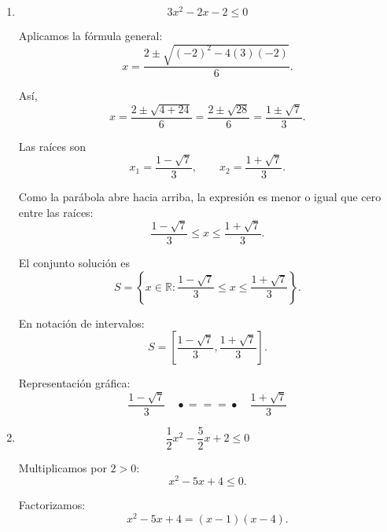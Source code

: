 \documentclass[12pt]{article}
\begin{document}
{\begin{enumerate}
Multiplicamos por \(-1\), invirtiendo el sentido de la desigualdad:
\[
x^2-3x-6\geq0.
\]

Aplicamos la fórmula general:
\[
x=
\frac{3\pm\sqrt{(-3)^2-4(1)(-6)}}{2}
=
\frac{3\pm\sqrt{9+24}}{2}.
\]

Por tanto,
\[
x=
\frac{3\pm\sqrt{33}}{2}.
\]

Las raíces son
\[
x_1=
\frac{3-\sqrt{33}}{2},
\qquad
x_2=
\frac{3+\sqrt{33}}{2}.
\]

Como
\[
x^2-3x-6\geq0,
\]

la solución corresponde a los intervalos exteriores:
\[
x\leq
\frac{3-\sqrt{33}}{2}
\qquad\text{o}\qquad
x\geq
\frac{3+\sqrt{33}}{2}.
\]

El conjunto solución es
\[
\boxed{
S=
\left\{
x\in\mathbb{R}:
x\leq
\frac{3-\sqrt{33}}{2}
\text{ o }
x\geq
\frac{3+\sqrt{33}}{2}
\right\}.
}
\]

En notación de intervalos:
\[
\boxed{
S=
\left(
-\infty,
\frac{3-\sqrt{33}}{2}
\right]
\cup
\left[
\frac{3+\sqrt{33}}{2},
\infty
\right).
}
\]

\item
\[
3x^2-2x-2\leq0
\]

Aplicamos la fórmula general:
\[
x=
\frac{2\pm\sqrt{(-2)^2-4(3)(-2)}}{6}.
\]

Así,
\[
x
=
\frac{2\pm\sqrt{4+24}}{6}
=
\frac{2\pm\sqrt{28}}{6}
=
\frac{1\pm\sqrt{7}}{3}.
\]

Las raíces son
\[
x_1=
\frac{1-\sqrt{7}}{3},
\qquad
x_2=
\frac{1+\sqrt{7}}{3}.
\]

Como la parábola abre hacia arriba, la expresión es menor o igual que
cero entre las raíces:
\[
\frac{1-\sqrt{7}}{3}
\leq x\leq
\frac{1+\sqrt{7}}{3}.
\]

El conjunto solución es
\[
\boxed{
S=
\left\{
x\in\mathbb{R}:
\frac{1-\sqrt{7}}{3}
\leq x\leq
\frac{1+\sqrt{7}}{3}
\right\}.
}
\]

En notación de intervalos:
\[
\boxed{
S=
\left[
\frac{1-\sqrt{7}}{3},
\frac{1+\sqrt{7}}{3}
\right].
}
\]

Representación gráfica:
\[
\frac{1-\sqrt{7}}{3}
\quad
\bullet\!\!=\!\!=\!\!=\!\bullet
\quad
\frac{1+\sqrt{7}}{3}
\]

\item
\[
\frac{1}{2}x^2-\frac{5}{2}x+2\leq0
\]

Multiplicamos por \(2>0\):
\[
x^2-5x+4\leq0.
\]

Factorizamos:
\[
x^2-5x+4=(x-1)(x-4).
\]


\end{enumerate}}
\end{document}
